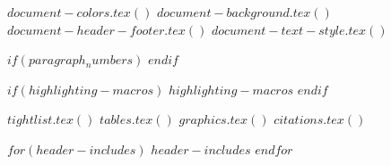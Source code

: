 \usepackage{setspace}
\usepackage[nodayofweek]{datetime}
\usepackage[top=6cm]{geometry}


$document-colors.tex()$
$document-background.tex()$
$document-header-footer.tex()$
$document-text-style.tex()$

$if(paragraph_numbers)$
  \renewcommand{\theparagraph}{\S\arabic{paragraph}}
  \setcounter{secnumdepth}{4}
$endif$

$if(highlighting-macros)$
  $highlighting-macros$
$endif$

$tightlist.tex()$
$tables.tex()$
$graphics.tex()$
$citations.tex()$

$for(header-includes)$
  $header-includes$
$endfor$
